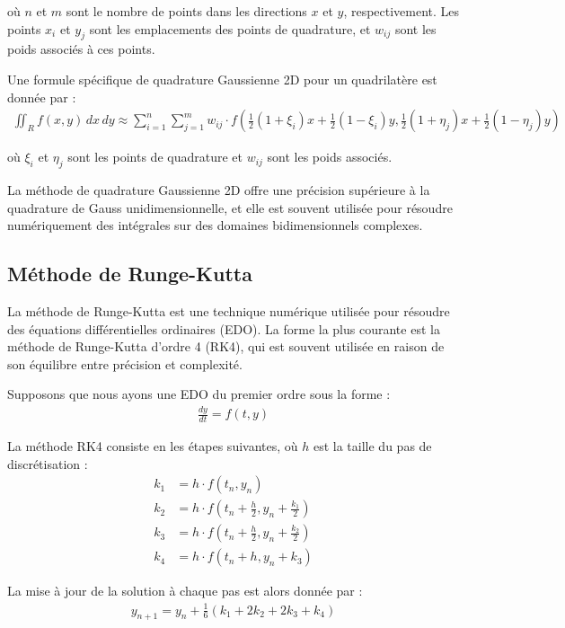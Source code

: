 \documentclass[10pt,a4paper]{article}
\begin{document}
où $n$ et $m$ sont le nombre de points dans les directions $x$ et $y$, respectivement. Les points $x_i$ et $y_j$ sont les emplacements des points de quadrature, et $w_{ij}$ sont les poids associés à ces points.

Une formule spécifique de quadrature Gaussienne 2D pour un quadrilatère est donnée par :
\begin{align*}
\iint_{R} f(x, y) \,dx\,dy \approx \sum_{i=1}^{n} \sum_{j=1}^{m} w_{ij} \cdot f\left(\frac{1}{2}(1 + \xi_i)x + \frac{1}{2}(1 - \xi_i)y, \frac{1}{2}(1 + \eta_j)x + \frac{1}{2}(1 - \eta_j)y\right)
\end{align*}

où $\xi_i$ et $\eta_j$ sont les points de quadrature et $w_{ij}$ sont les poids associés.

La méthode de quadrature Gaussienne 2D offre une précision supérieure à la quadrature de Gauss unidimensionnelle, et elle est souvent utilisée pour résoudre numériquement des intégrales sur des domaines bidimensionnels complexes.


\subsection{Méthode de Runge-Kutta}



La méthode de Runge-Kutta est une technique numérique utilisée pour résoudre des équations différentielles ordinaires (EDO). La forme la plus courante est la méthode de Runge-Kutta d'ordre 4 (RK4), qui est souvent utilisée en raison de son équilibre entre précision et complexité.

Supposons que nous ayons une EDO du premier ordre sous la forme :
\begin{align*}
\frac{dy}{dt} = f(t, y)
\end{align*}

La méthode RK4 consiste en les étapes suivantes, où $h$ est la taille du pas de discrétisation :
\begin{align*}
k_1 &= h \cdot f(t_n, y_n) \\
k_2 &= h \cdot f(t_n + \frac{h}{2}, y_n + \frac{k_1}{2}) \\
k_3 &= h \cdot f(t_n + \frac{h}{2}, y_n + \frac{k_2}{2}) \\
k_4 &= h \cdot f(t_n + h, y_n + k_3)
\end{align*}

La mise à jour de la solution à chaque pas est alors donnée par :
\begin{align*}
y_{n+1} = y_n + \frac{1}{6}(k_1 + 2k_2 + 2k_3 + k_4)
\end{align*}
\end{document}

